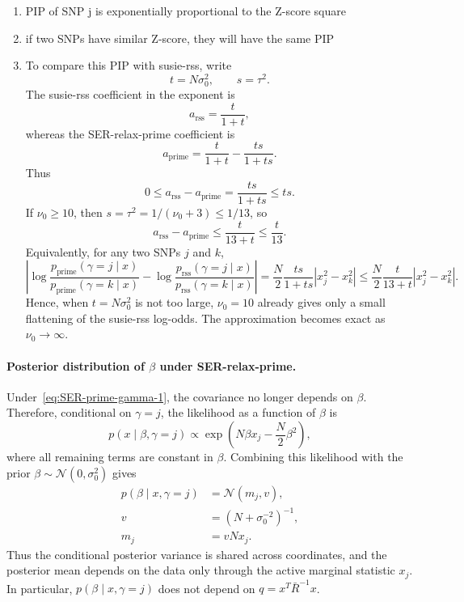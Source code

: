 \documentclass[11pt]{article}
\begin{document}
\begin{enumerate}
\item PIP of SNP j is exponentially proportional to the Z-score square
\item if two SNPs have similar Z-score, they will have the same PIP
\item To compare this PIP with susie-rss, write
\[
t=N\sigma_0^2,\qquad s=\tau^2.
\]
The susie-rss coefficient in the exponent is
\[
a_{\mathrm{rss}}=\frac{t}{1+t},
\]
whereas the SER-relax-prime coefficient is
\[
a_{\mathrm{prime}}
=
\frac{t}{1+t}-\frac{ts}{1+ts}.
\]
Thus
\[
0\le a_{\mathrm{rss}}-a_{\mathrm{prime}}
=
\frac{ts}{1+ts}
\le ts.
\]
If $\nu_0\ge 10$, then $s=\tau^2=1/(\nu_0+3)\le 1/13$, so
\[
a_{\mathrm{rss}}-a_{\mathrm{prime}}
\le
\frac{t}{13+t}
\le
\frac{t}{13}.
\]
Equivalently, for any two SNPs $j$ and $k$,
\[
\left|
\log\frac{p_{\mathrm{prime}}(\gamma=j\mid x)}
{p_{\mathrm{prime}}(\gamma=k\mid x)}
-
\log\frac{p_{\mathrm{rss}}(\gamma=j\mid x)}
{p_{\mathrm{rss}}(\gamma=k\mid x)}
\right|
=
\frac{N}{2}\frac{ts}{1+ts}|x_j^2-x_k^2|
\le
\frac{N}{2}\frac{t}{13+t}|x_j^2-x_k^2|.
\]
Hence, when $t=N\sigma_0^2$ is not too large, $\nu_0=10$ already gives only a
small flattening of the susie-rss log-odds. The approximation becomes exact as
$\nu_0\to\infty$.
\end{enumerate}

\paragraph{Posterior distribution of $\beta$ under SER-relax-prime.}
Under~\eqref{eq:SER-prime-gamma-1}, the covariance no longer depends on $\beta$.
Therefore, conditional on $\gamma=j$, the likelihood as a function of $\beta$ is
\[
p(x\mid \beta,\gamma=j)
\propto
\exp\!\left(N\beta x_j-\frac{N}{2}\beta^2\right),
\]
where all remaining terms are constant in $\beta$. Combining this likelihood
with the prior $\beta\sim\mathcal N(0,\sigma_0^2)$ gives
\begin{align}
p(\beta\mid x,\gamma=j)
&=
\mathcal N(m_j,v),\\
v&=\left(N+\sigma_0^{-2}\right)^{-1},\\
m_j&=vNx_j.
\end{align}
Thus the conditional posterior variance is shared across coordinates, and the
posterior mean depends on the data only through the active marginal statistic
$x_j$. In particular, $p(\beta\mid x,\gamma=j)$ does not depend on
$q=x^T\bar R^{-1}x$.
\end{document}
